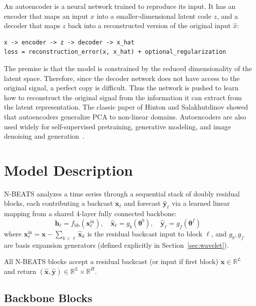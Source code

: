 \documentclass{article}
\begin{document}
An autoencoder is a neural network trained to reproduce its input. It has an encoder that maps an input $x$ into a smaller-dimensional latent code $z$, and a decoder that maps $z$ back into a reconstructed version of the original input $\hat{x}$:
\begin{verbatim}
x -> encoder -> z -> decoder -> x_hat
loss = reconstruction_error(x, x_hat) + optional_regularization
\end{verbatim}

The premise is that the model is constrained by the reduced dimensionality of the latent space. Therefore, since the decoder network does not have access to the original signal, a perfect copy is difficult. Thus the network is pushed to learn how to reconstruct the original signal from the information it can extract from the latent representation. The classic paper of Hinton and Salakhutdinov \citep{hinton2006reducing} showed that autoencoders generalize PCA to non-linear domains. Autoencoders are also used widely for self-supervised pretraining, generative modeling, and image denoising and generation~\citep{vincent2008denoising}.


\section{Model Description}
\label{sec:method}

N-BEATS \citep{oreshkin2020nbeats} analyzes a time series through a sequential stack of doubly residual blocks, each contributing a backcast $\hat{\mathbf{x}}_{\ell}$ and forecast $\hat{\mathbf{y}}_{\ell}$ via a learned linear mapping from a shared 4-layer fully connected backbone:
\begin{equation*}
\mathbf{h}_{\ell} = f_{\text{bb}}(\mathbf{x}_{\ell}^{\text{in}}), \quad \hat{\mathbf{x}}_{\ell} = g_b(\boldsymbol{\theta}^b), \quad \hat{\mathbf{y}}_{\ell} = g_f(\boldsymbol{\theta}^f)
\end{equation*}
where $\mathbf{x}_{\ell}^{\text{in}} = \mathbf{x} - \sum_{k < \ell}\hat{\mathbf{x}}_k$ is the residual backcast input to block $\ell$, and $g_b, g_f$ are basis expansion generators (defined explicitly in Section~\ref{sec:wavelet}).

All N-BEATS blocks accept a residual backcast (or input if first block) $\mathbf{x} \in \mathbb{R}^L$ and return $(\hat{\mathbf{x}}, \hat{\mathbf{y}}) \in \mathbb{R}^L \times \mathbb{R}^H$.

\subsection{Backbone Blocks}
\end{document}
